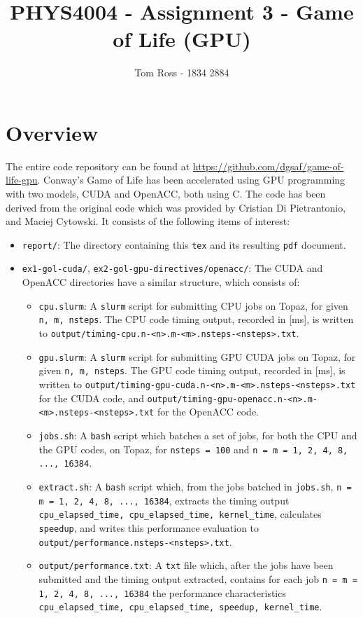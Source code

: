 \documentclass{article}
\title{PHYS4004 - Assignment 3 - Game of Life (GPU)}
\author{Tom Ross - 1834 2884}
\date{}
\newcommand{\lilf}[1]{\lstinline[style=ff]{#1}}
\begin{document}
\tableofcontents

\clearpage
\section{Overview}
\label{sec:overview}

The entire code repository can be found at
\url{https://github.com/dgsaf/game-of-life-gpu}.
Conway's Game of Life has been accelerated using GPU programming with two
models, CUDA and OpenACC, both using C.
The code has been derived from the original code which was provided by Cristian
Di Pietrantonio, and Maciej Cytowski.
It consists of the following items of interest:
\begin{itemize}
\item \lilf{report/}:
  The directory containing this \lilf{tex} and its resulting \lilf{pdf}
  document.

\item \lilf{ex1-gol-cuda/}, \lilf{ex2-gol-gpu-directives/openacc/}:
  The CUDA and OpenACC directories have a similar structure, which consists of:

  \begin{itemize}
  \item \lilf{cpu.slurm}:
    A \lilf{slurm} script for submitting CPU jobs on Topaz, for given
    \lstinline{n, m, nsteps}.
    The CPU code timing output, recorded in [\si{\milli\second}], is written to
    \lstinline{output/timing-cpu.n-<n>.m-<m>.nsteps-<nsteps>.txt}.

  \item \lilf{gpu.slurm}:
    A \lilf{slurm} script for submitting GPU CUDA jobs on Topaz, for given
    \lstinline{n, m, nsteps}.
    The GPU code timing output, recorded in [\si{\milli\second}], is written to
    \lilf{output/timing-gpu-cuda.n-<n>.m-<m>.nsteps-<nsteps>.txt} for the CUDA
    code, and \lilf{output/timing-gpu-openacc.n-<n>.m-<m>.nsteps-<nsteps>.txt}
    for the OpenACC code.

  \item \lilf{jobs.sh}:
    A \lilf{bash} script which batches a set of jobs, for both
    the CPU and the GPU codes, on Topaz, for \lstinline{nsteps = 100} and
    \lstinline{n = m = 1, 2, 4, 8, ..., 16384}.

  \item \lilf{extract.sh}:
    A \lilf{bash} script which, from the jobs batched in \lilf{jobs.sh},
    \lstinline{n = m = 1, 2, 4, 8, ..., 16384}, extracts the timing output
    \lstinline{cpu_elapsed_time, cpu_elapsed_time, kernel_time}, calculates
    \lstinline{speedup}, and writes this performance evaluation to
    \lilf{output/performance.nsteps-<nsteps>.txt}.

  \item \lilf{output/performance.txt}:
    A \lilf{txt} file which, after the jobs have been submitted and the timing
    output extracted, contains for each job
    \lstinline{n = m = 1, 2, 4, 8, ..., 16384} the performance characteristics
    \lstinline{cpu_elapsed_time, cpu_elapsed_time, speedup, kernel_time}.
  \end{itemize}
\end{itemize}
\end{document}
